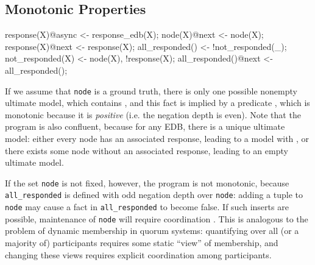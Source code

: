 \subsection{Monotonic Properties}


\begin{example}
\begin{Dedalus}
response(X)@async <- response_edb(X);
node(X)@next <- node(X);
response(X)@next <- response(X);
all_responded() <- !not_responded(_);
not_responded(X) <- node(X), !response(X);
all_responded()@next <- all_responded();
\end{Dedalus}
\end{example}


If we assume that 
\texttt{node} is a ground truth,
there is only one possible nonempty ultimate model, which contains , and this fact is implied by a predicate , which is monotonic because it is {\em positive} (i.e. the negation depth is even). 
Note that the program is also confluent, because for any EDB, there is a unique ultimate model: either every node has an associated response, leading to a model with , or there exists some node without an associated response, leading to an empty ultimate model.

If the set \texttt{node} is not fixed, however, the program is not monotonic, because 
\texttt{all\_responded} is defined with odd negation depth over \texttt{node}: adding a tuple
to \texttt{node} may cause a fact in \texttt{all\_responded} to become false.  If such inserts
are possible, maintenance of \texttt{node} will require coordination .  This is analogous to
the problem of dynamic membership in quorum systems: quantifying over all (or a majority
of) participants requires some static ``view'' of membership, and changing these views requires
explicit coordination among participants.




